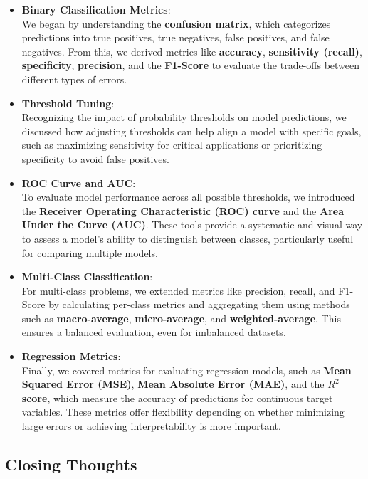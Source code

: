 \documentclass[
]{book}
\theoremstyle{definition}
\theoremstyle{definition}
\theoremstyle{definition}
\theoremstyle{definition}
\theoremstyle{remark}
\begin{document}
\begin{itemize}
\item
  \textbf{Binary Classification Metrics}:\\
  We began by understanding the \textbf{confusion matrix}, which categorizes predictions into true positives, true negatives, false positives, and false negatives. From this, we derived metrics like \textbf{accuracy}, \textbf{sensitivity (recall)}, \textbf{specificity}, \textbf{precision}, and the \textbf{F1-Score} to evaluate the trade-offs between different types of errors.
\item
  \textbf{Threshold Tuning}:\\
  Recognizing the impact of probability thresholds on model predictions, we discussed how adjusting thresholds can help align a model with specific goals, such as maximizing sensitivity for critical applications or prioritizing specificity to avoid false positives.
\item
  \textbf{ROC Curve and AUC}:\\
  To evaluate model performance across all possible thresholds, we introduced the \textbf{Receiver Operating Characteristic (ROC) curve} and the \textbf{Area Under the Curve (AUC)}. These tools provide a systematic and visual way to assess a model's ability to distinguish between classes, particularly useful for comparing multiple models.
\item
  \textbf{Multi-Class Classification}:\\
  For multi-class problems, we extended metrics like precision, recall, and F1-Score by calculating per-class metrics and aggregating them using methods such as \textbf{macro-average}, \textbf{micro-average}, and \textbf{weighted-average}. This ensures a balanced evaluation, even for imbalanced datasets.
\item
  \textbf{Regression Metrics}:\\
  Finally, we covered metrics for evaluating regression models, such as \textbf{Mean Squared Error (MSE)}, \textbf{Mean Absolute Error (MAE)}, and the \textbf{\(R^2\) score}, which measure the accuracy of predictions for continuous target variables. These metrics offer flexibility depending on whether minimizing large errors or achieving interpretability is more important.
\end{itemize}

\subsection*{Closing Thoughts}\label{closing-thoughts}
\end{document}
